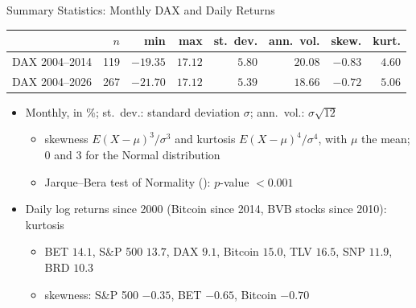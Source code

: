 \begin{frame}{Summary Statistics: Monthly DAX and Daily Returns}
\itemsize{\footnotesize}
\begin{center}
\footnotesize
\begin{tabular}{lrrrrrrr}
\toprule
& $n$ & min & max & st.\ dev. & ann.\ vol. & skew. & kurt. \\
\midrule
DAX 2004--2014 & 119 & $-19.35$ & $17.12$ & $5.80$ & $20.08$ & $-0.83$ & $4.60$ \\
DAX 2004--2026 & 267 & $-21.70$ & $17.12$ & $5.39$ & $18.66$ & $-0.72$ & $5.06$ \\
\bottomrule
\end{tabular}
\end{center}
\begin{itemize}
    \item Monthly, in \%; st.\ dev.: standard deviation $\sigma$; ann.\ vol.: $\sigma\sqrt{12}$
    \begin{itemize}
        \item skewness $E(X - \mu)^3/\sigma^3$ and kurtosis $E(X - \mu)^4/\sigma^4$, with $\mu$ the mean; 0 and 3 for the Normal distribution
        \item Jarque--Bera test of Normality (): $p$-value $<0.001$
    \end{itemize}
    \item Daily log returns since 2000 (Bitcoin since 2014, BVB stocks since 2010): kurtosis
    \begin{itemize}
        \item BET $14.1$, S\&P 500 $13.7$, DAX $9.1$, Bitcoin $15.0$, TLV $16.5$, SNP $11.9$, BRD $10.3$
        \item skewness: S\&P 500 $-0.35$, BET $-0.65$, Bitcoin $-0.70$
    \end{itemize}
\end{itemize}
\end{frame}


